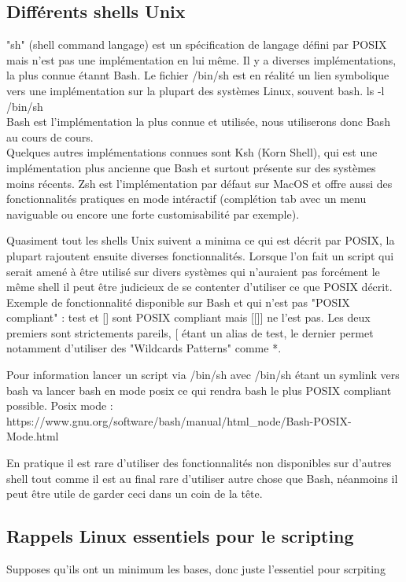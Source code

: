 \documentclass[11pt,a4paper]{article}
\begin{document}
\subsection{Différents shells Unix}
"sh" (shell command langage) est un spécification de langage défini par POSIX mais n'est pas une implémentation en lui même. Il y a diverses implémentations, la plus connue étannt Bash.
Le fichier /bin/sh est en réalité un lien symbolique vers une implémentation sur la plupart des systèmes Linux, souvent bash. ls -l /bin/sh \\
Bash est l'implémentation la plus connue et utilisée, nous utiliserons donc Bash au cours de cours.\\
Quelques autres implémentations connues sont Ksh (Korn Shell), qui est une implémentation plus ancienne que Bash et surtout présente sur des systèmes moins récents.
Zsh est l'implémentation par défaut sur MacOS et offre aussi des fonctionnalités pratiques en mode intéractif (complétion tab avec un menu naviguable ou encore une forte customisabilité par exemple).

Quasiment tout les shells Unix suivent a minima ce qui est décrit par POSIX, la plupart rajoutent ensuite diverses fonctionnalités. Lorsque l'on fait un script qui serait amené à être utilisé sur divers systèmes qui n'auraient pas forcément le même shell il peut être judicieux de se contenter d'utiliser ce que POSIX décrit.
Exemple de fonctionnalité disponible sur Bash et qui n'est pas "POSIX compliant" : 
test et [] sont POSIX compliant mais [[]] ne l'est pas. Les deux premiers sont strictements pareils, [ étant un alias de test, le dernier permet notamment d'utiliser des "Wildcards Patterns" comme *.

Pour information lancer un script via /bin/sh avec /bin/sh étant un symlink vers bash va lancer bash en mode posix ce qui rendra bash le plus POSIX compliant possible.
Posix mode : https://www.gnu.org/software/bash/manual/html\_node/Bash-POSIX-Mode.html

En pratique il est rare d'utiliser des fonctionnalités non disponibles sur d'autres shell tout comme il est au final rare d'utiliser autre chose que Bash, néanmoins il peut être utile de garder ceci dans un coin de la tête.

\subsection{Rappels Linux essentiels pour le scripting}
Supposes qu'ils ont un minimum les bases, donc juste l'essentiel pour scrpiting
\end{document}
